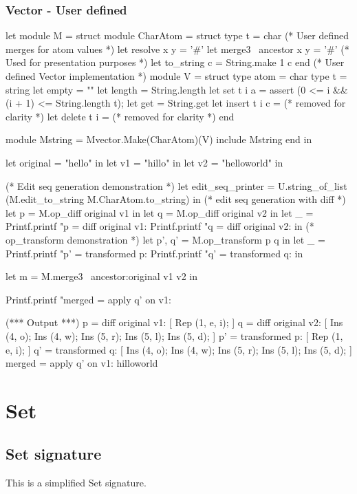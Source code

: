 \documentclass{article}
\begin{document}
\subsubsection{Vector - User defined}
\begin{longlisting}
let module M = struct
  module CharAtom = struct
    type t = char
    (* User defined merges for atom values *)
    let resolve x y = '#'
    let merge3 ~ancestor x y = '#'
    (* Used for presentation purposes *)
    let to_string c = String.make 1 c
  end
  (* User defined Vector implementation *)
  module V = struct
    type atom = char
    type t = string
    let empty = ""
    let length = String.length
    let set t i a =
      assert (0 <= i && (i + 1) <= String.length t);
    let get = String.get
    let insert t i c =
      (* removed for clarity *)
    let delete t i =
      (* removed for clarity *)
  end

  module Mstring = Mvector.Make(CharAtom)(V)
  include Mstring
end in

let original = "hello" in
let v1 = "hillo" in
let v2 = "helloworld" in

(* Edit seq generation demonstration *)
let edit_seq_printer = U.string_of_list (M.edit_to_string M.CharAtom.to_string) in
(* edit seq generation with diff *)
let p = M.op_diff original v1 in
let q = M.op_diff original v2 in
let _ = 
  Printf.printf "p = diff original v1: %
  Printf.printf "q = diff original v2: %
in
  (* op_transform demonstration *)
  let p', q' = M.op_transform p q in
  let _ = 
    Printf.printf "p' = transformed p: %
    Printf.printf "q' = transformed q: %
  in

let m = M.merge3 ~ancestor:original v1 v2 in

Printf.printf "merged = apply q' on v1: %

(*** Output ***)
p = diff original v1: [ Rep (1, e, i); ]
q = diff original v2: [ Ins (4, o); Ins (4, w); Ins (5, r); Ins (5, l); Ins (5, d); ]
p' = transformed p: [ Rep (1, e, i); ]
q' = transformed q: [ Ins (4, o); Ins (4, w); Ins (5, r); Ins (5, l); Ins (5, d); ]
merged = apply q' on v1: hilloworld
\end{longlisting}

\newpage
\section{Set}
\subsection{Set signature}
This is a simplified Set signature. 
\end{document}
